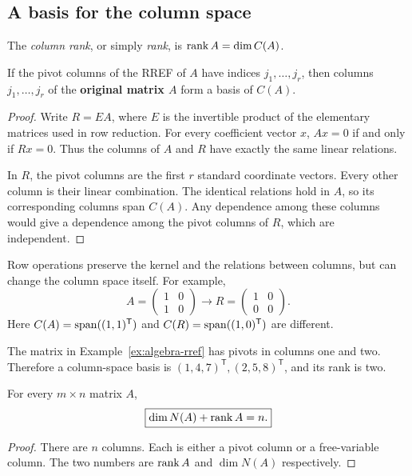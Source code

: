 \subsection{A basis for the column space}

\begin{definition}
The \emph{column rank}, or simply \emph{rank}, is
$\operatorname{rank} A=\dim C(A)$.
\end{definition}

\begin{theorem}
If the pivot columns of the RREF of $A$ have indices
$j_1,\ldots,j_r$, then columns $j_1,\ldots,j_r$ of the
\textbf{original matrix $A$} form a basis of $C(A)$.
\end{theorem}
\begin{proof}
Write $R=EA$, where $E$ is the invertible product of the elementary
matrices used in row reduction. For every coefficient vector $x$,
$Ax=0$ if and only if $Rx=0$. Thus the columns of $A$ and $R$ have
exactly the same linear relations.

In $R$, the pivot columns are the first $r$ standard coordinate vectors.
Every other column is their linear combination.
The identical relations hold in $A$, so its corresponding columns span
$C(A)$. Any dependence among these columns would give a dependence among
the pivot columns of $R$, which are independent.
\end{proof}

\begin{remark}
Row operations preserve the kernel and the relations between columns,
but can change the column space itself. For example,
\[
 A=\begin{pmatrix}1&0\\1&0\end{pmatrix}
 \longrightarrow R=\begin{pmatrix}1&0\\0&0\end{pmatrix}.
\]
Here $C(A)=\operatorname{span}((1,1)^{\mathsf T})$ and
$C(R)=\operatorname{span}((1,0)^{\mathsf T})$ are different.
\end{remark}

\begin{example}
The matrix in Example~\ref{ex:algebra-rref} has pivots in columns one and
two. Therefore a column-space basis is
$(1,4,7)^{\mathsf T},(2,5,8)^{\mathsf T}$, and its rank is two.
\end{example}

\begin{theorem}
For every $m\times n$ matrix $A$,
\[
 \boxed{\dim N(A)+\operatorname{rank} A=n.}
\]
\end{theorem}
\begin{proof}
There are $n$ columns. Each is either a pivot column or a free-variable
column. The two numbers are $\operatorname{rank} A$ and $\dim N(A)$ respectively.
\end{proof}

